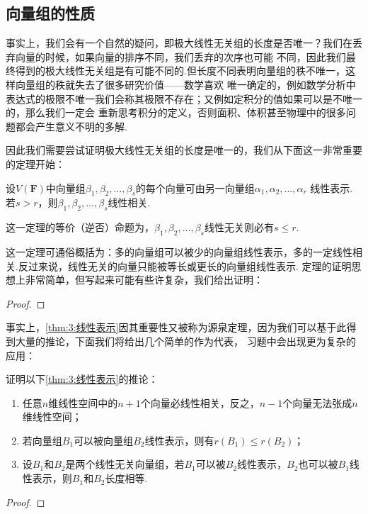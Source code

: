 \subsection{向量组的性质}
事实上，我们会有一个自然的疑问，即极大线性无关组的长度是否唯一？我们在丢弃向量的时候，如果向量的排序不同，我们丢弃的次序也可能
不同，因此我们最终得到的极大线性无关组是有可能不同的.但长度不同表明向量组的秩不唯一，这样向量组的秩就失去了很多研究价值——数学喜欢
唯一确定的，例如数学分析中表达式的极限不唯一我们会称其极限不存在；又例如定积分的值如果可以是不唯一的，那么我们一定会
重新思考积分的定义，否则面积、体积甚至物理中的很多问题都会产生意义不明的多解.

因此我们需要尝试证明极大线性无关组的长度是唯一的，我们从下面这一非常重要的定理开始：
\begin{theorem}\label{thm:3:线性表示}
    设$V(\mathbf{F})$中向量组$ \beta_1,\beta_2,\ldots,\beta_s $的每个向量可由另一向量组$\alpha_1,\alpha_2,\ldots,\alpha_r$
    线性表示.若$s>r$，则$ \beta_1,\beta_2,\ldots,\beta_s $线性相关.
\end{theorem}
这一定理的等价（逆否）命题为，$ \beta_1,\beta_2,\ldots,\beta_s $线性无关则必有$s\leqslant r$.

这一定理可通俗概括为：多的向量组可以被少的向量组线性表示，多的一定线性相关.反过来说，线性无关的向量只能被等长或更长的向量组线性表示.
定理的证明思想上非常简单，但写起来可能有些许复杂，我们给出证明：

\begin{proof}
    
\end{proof}

事实上，\autoref{thm:3:线性表示}因其重要性又被称为源泉定理，因为我们可以基于此得到大量的推论，下面我们将给出几个简单的作为代表，
习题中会出现更为复杂的应用：
\begin{example}\label{ex:3:线性表示推论}
    证明以下\autoref{thm:3:线性表示}的推论：
    \begin{enumerate}[label=(\arabic*)]
        \item 任意$n$维线性空间中的$n+1$个向量必线性相关，反之，$n-1$个向量无法张成$n$维线性空间；
        \item 若向量组$B_1$可以被向量组$B_2$线性表示，则有$r(B_1)\leqslant r(B_2)$；
        \item 设$B_1$和$B_2$是两个线性无关向量组，若$B_1$可以被$B_2$线性表示，$B_2$也可以被$B_1$线性表示，则$B_1$和$B_2$长度相等.
    \end{enumerate}
\end{example}
\begin{proof}
    
\end{proof}


